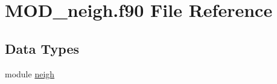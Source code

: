\hypertarget{MOD__neigh_8f90}{\section{M\-O\-D\-\_\-neigh.\-f90 File Reference}
\label{MOD__neigh_8f90}
}
\subsection*{Data Types}
\begin{DoxyCompactItemize}
\item 
module \hyperlink{classneigh}{neigh}
\end{DoxyCompactItemize}

